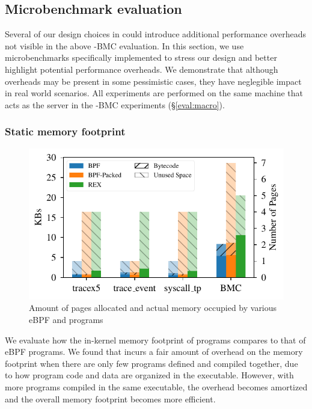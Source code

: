 \subsection{Microbenchmark evaluation}
Several of our design choices in
    \projname{} could introduce additional performance overheads
not visible in the above \projname{}-BMC evaluation.
In this section, we use microbenchmarks specifically implemented to stress our design and better highlight potential
    performance overheads. We demonstrate that although overheads may be
    present in some pessimistic cases, they have neglegible impact in real world scenarios.
All experiments are performed on the same machine that acts as the server in
    the \projname{}-BMC experiments (\S\ref{eval:macro}).

\subsubsection{Static memory footprint}
\label{eval:mem-footprint}
\begin{figure}[t]
    \includegraphics[width=1.0\linewidth]{figs/mem.pdf}
    \centering
    \vspace{-25pt}
    \caption{Amount of pages allocated and actual memory occupied by various
        eBPF and \projname{} programs}
    \label{fig:eval-mem-footprint}
    \vspace{-10pt}
\end{figure}
We evaluate how the in-kernel memory footprint of \projname{} programs
    compares to that of eBPF programs.
We found that \projname{} incurs a fair amount of overhead on the memory
    footprint when there are only few programs defined and compiled together,
    due to how program code and data are organized in the executable.
However, with more programs compiled in the same executable, the overhead
    becomes amortized and the overall memory footprint becomes more efficient.


